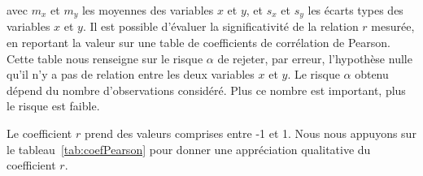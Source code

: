 avec $m_x$ et $m_y$ les moyennes des variables $x$ et $y$, et $s_x$ et $s_y$ les écarts types des variables $x$ et $y$. Il est possible d'évaluer la significativité de la relation $r$ mesurée, en reportant la valeur sur une table de coefficients de corrélation de Pearson. Cette table nous renseigne sur le risque $\alpha$ de rejeter, par erreur, l’hypothèse nulle qu'il n'y a pas de relation entre les deux variables $x$ et $y$. Le risque $\alpha$ obtenu dépend du nombre d'observations considéré. Plus ce nombre est important, plus le risque est faible. 

Le coefficient $r$ prend des valeurs comprises entre -1 et 1. Nous nous appuyons sur le tableau~\ref{tab:coefPearson} pour donner une appréciation qualitative du coefficient $r$.



